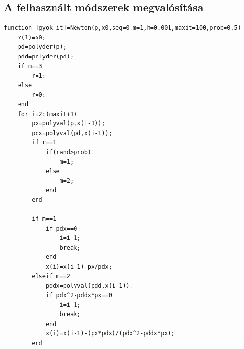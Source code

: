 \documentclass[a4paper,12pt]{report}
\begin{document}
\begin{appendices}
		\section{A felhasznált módszerek megvalósítása} \label{Newton}
			\begin{singlespace}
            \begin{lstlisting}[caption=Newton.m]
function [gyok it]=Newton(p,x0,seq=0,m=1,h=0.001,maxit=100,prob=0.5)
    x(1)=x0;                                                        
    pd=polyder(p);                                                  
    pdd=polyder(pd);                                                
    if m==3                                                         
        r=1;                                                        
    else                                                            
        r=0;                                                        
    end                                                             
    for i=2:(maxit+1)                                               
        px=polyval(p,x(i-1));                                       
        pdx=polyval(pd,x(i-1));                                     
        if r==1                                                     
            if(rand>prob)                                           
                m=1;                                                
            else                                                    
                m=2;                                                
            end                                                     
        end                                                         
                                                                    
        if m==1                                                     
            if pdx==0                                               
                i=i-1;                                              
                break;                                              
            end                                                     
            x(i)=x(i-1)-px/pdx;                                     
        elseif m==2                                                 
            pddx=polyval(pdd,x(i-1));                               
            if pdx^2-pddx*px==0                                     
                i=i-1;                                              
                break;                                              
            end                                                     
            x(i)=x(i-1)-(px*pdx)/(pdx^2-pddx*px);                   
        end                                                         
                                                                    

\end{lstlisting}
\end{singlespace}
\end{appendices}
\end{document}
